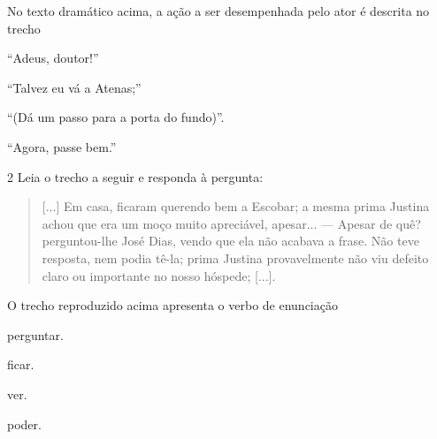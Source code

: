 No texto dramático acima, a ação a ser desempenhada pelo ator é descrita
no trecho

\begin{escolha}
\item ``Adeus, doutor!''

\item ``Talvez eu vá a Atenas;''

\item ``(Dá um passo para a porta do fundo)''.

\item ``Agora, passe bem.''
\end{escolha}


\num{2} Leia o trecho a seguir e responda à pergunta:

\begin{quote}
{[}...{]} Em casa, ficaram querendo bem a Escobar; a mesma prima
Justina achou que era um moço muito apreciável, apesar... --- Apesar de
quê? perguntou-lhe José Dias, vendo que ela não acabava a frase. Não
teve resposta, nem podia tê-la; prima Justina provavelmente não viu
defeito claro ou importante no nosso hóspede; {[}...{]}.

\end{quote}

O trecho reproduzido acima apresenta o verbo de enunciação

\begin{escolha}
\item perguntar.

\item ficar.

\item ver.

\item poder.
\end{escolha}

